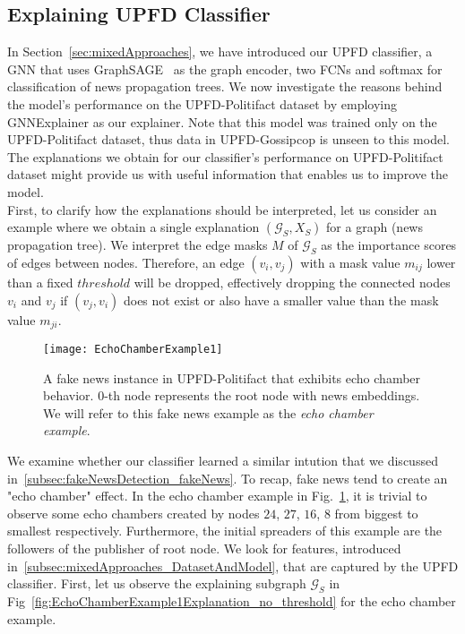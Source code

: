 \subsection{Explaining UPFD Classifier}
\label{subsec:ExplaniningGNNs_ExplainingUPFDClassifier}
In Section~\ref{sec:mixedApproaches}, we have introduced our UPFD classifier, a GNN that uses GraphSAGE~\parencite{GraphSAGE_Hamilton} as the graph encoder, two FCNs and softmax for classification of news propagation trees. We now investigate the reasons behind the model's performance on the UPFD-Politifact dataset by employing GNNExplainer as our explainer. Note that this model was trained only on the UPFD-Politifact dataset, thus data in UPFD-Gossipcop is unseen to this model. The explanations we obtain for our classifier's performance on UPFD-Politifact dataset might provide us with useful information that enables us to improve the model.\\
First, to clarify how the explanations should be interpreted, let us consider an example where we obtain a single explanation $(\mathcal{G}_S, X_S)$ for a graph (news propagation tree). We interpret the edge masks $M$ of $\mathcal{G}_S$ as the importance scores of edges between nodes. Therefore, an edge $(v_i, v_j)$ with a mask value $m_{ij}$ lower than a fixed $threshold$ will be dropped, effectively dropping the connected nodes $v_i$ and $v_j$ if $(v_j, v_i)$ does not exist or also have a smaller value than the mask value $m_{ji}$.\\
\begin{figure}
    \centering
    \texttt{[image: EchoChamberExample1]}
    \caption[Echo chamber example from UPFD-Politifact.]{A fake news instance in UPFD-Politifact that exhibits echo chamber behavior. $0$-th node represents the root node with news embeddings. We will refer to this fake news example as the \emph{echo chamber example}.}
    \label{fig:echoChamberExample1}
\end{figure}
We examine whether our classifier learned a similar intution that we discussed in~\ref{subsec:fakeNewsDetection_fakeNews}. To recap, fake news tend to create an "echo chamber" effect. In the echo chamber example in Fig.~\ref{fig:echoChamberExample1}, it is trivial to observe some echo chambers created by nodes $24$, $27$, $16$, $8$ from biggest to smallest respectively. Furthermore, the initial spreaders of this example are the followers of the publisher of root node. We look for features, introduced in~\ref{subsec:mixedApproaches_DatasetAndModel}, that are captured by the UPFD classifier. First, let us observe the explaining subgraph $\mathcal{G}_S$ in Fig~\ref{fig:EchoChamberExample1Explanation_no_threshold} for the echo chamber example.\\

